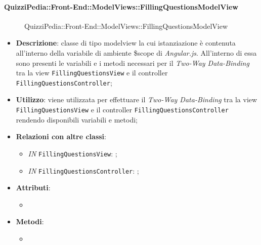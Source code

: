 \paragraph{QuizziPedia::Front-End::ModelViews::FillingQuestionsModelView}
\begin{figure} [ht]
	\centering
	\caption{QuizziPedia::Front-End::ModelViews::FillingQuestionsModelView}
\end{figure} \FloatBarrier
\begin{itemize}
	\item \textbf{Descrizione}: classe di tipo modelview la cui istanziazione è contenuta all'interno della variabile di ambiente \$scope di \textit{Angular.js}. All'interno di essa sono presenti le variabili e i metodi necessari per il \textit{Two-Way Data-Binding} tra la view \texttt{FillingQuestionsView} e il controller \texttt{FillingQuestionsController}; 
	\item \textbf{Utilizzo}: viene utilizzata per effettuare il \textit{Two-Way Data-Binding} tra la view \texttt{FillingQuestionsView} e il controller \texttt{FillingQuestionsController} rendendo disponibili variabili e metodi;
	\item \textbf{Relazioni con altre classi}:
	\begin{itemize}
		\item \textit{IN} \texttt{FillingQuestionsView}: ; 
		\item \textit{IN} \texttt{FillingQuestionsController}: ;
	\end{itemize}
	\item \textbf{Attributi}:
	\begin{itemize}
		\item
	\end{itemize}
	\item \textbf{Metodi}:
	\begin{itemize}
		\item 
	\end{itemize}
\end{itemize}

